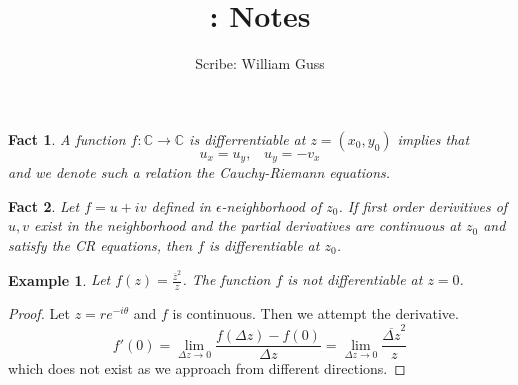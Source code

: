 \documentclass[letter]{article}
\title{\bCLASS: Notes }
\author{Scribe: William Guss}
\newtheorem{fact}{Fact}
\newtheorem{example}{Example}
\begin{document}
\maketitle
\thispagestyle{empty}
\begin{fact}
	A function $f: \mathbb{C} \to \mathbb{C}$ is differrentiable at $z = (x_0, y_0)$ implies that
	\begin{equation*}
		u_x = u_y,\;\;\;u_y=-v_x
	\end{equation*}
	and we denote such a relation the Cauchy-Riemann equations.
\end{fact}
\begin{fact}
	Let $f = u +iv$ defined  in $\epsilon$-neighborhood of $z_0$. If first order derivitives of $u,v$ exist in the neighborhood and 
	the partial derivatives are continuous at $z_0$ and satisfy the CR equations, then $f$ is differentiable at $z_0$.
\end{fact}
\begin{example}
	Let $f(z) = \frac{\overline{z}^2}{z}$. The function $f$ is not differentiable at $z = 0$.
\end{example}
\begin{proof}
	Let $z = re^{-i\theta}$ and $f$ is continuous. Then we attempt the derivative.
	\begin{equation*}
		f'(0) = \lim_{\Delta z \to 0} \frac{f(\Delta z)-f(0)}{\Delta z} = \lim_{\Delta z \to 0} \frac{\overline{\Delta z}^2}{z}
	\end{equation*}
	which does not exist as we approach from different directions.
\end{proof}
\end{document}
